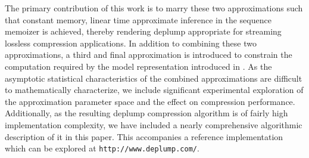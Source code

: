 The primary contribution of this work is to marry these two approximations such that constant memory, linear time approximate inference in the sequence memoizer is achieved, thereby rendering deplump appropriate for streaming lossless compression applications.  In addition to combining these two approximations, a third and final approximation is introduced to constrain the computation required by the model representation introduced in  \citep{Gasthaus2011}. As the asymptotic statistical characteristics of the combined approximations are difficult to mathematically characterize, we include significant experimental exploration of the approximation parameter space and the effect on compression performance.  Additionally, as the resulting deplump compression algorithm is of fairly high implementation complexity, we have included a nearly comprehensive algorithmic description of it in this paper.  This accompanies a reference implementation which can be explored at \texttt{http://www.deplump.com/}.

